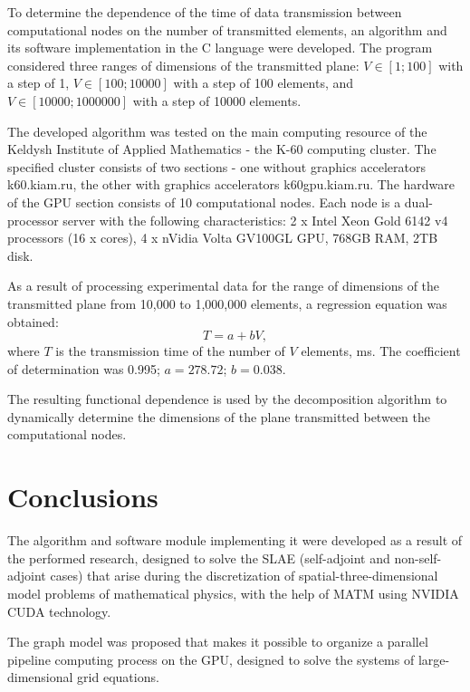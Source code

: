 \documentclass{svproc}
\begin{document}
To determine the dependence of the time of data transmission between computational nodes on the number of transmitted elements, an algorithm and its software implementation in the C language were developed.
The program considered three ranges of dimensions of the transmitted plane: $V\in[1; 100]$ with a step of 1,
$V\in[100; 10000]$ with a step of 100 elements, and
$V\in[10000; 1000000]$ with a step of 10000 elements. 

The developed algorithm was tested on the main computing resource of the Keldysh Institute of Applied Mathematics - the K-60 computing cluster.
The specified cluster consists of two sections - one without graphics accelerators k60.kiam.ru, the other with graphics accelerators k60gpu.kiam.ru.
The hardware of the GPU section consists of 10 computational nodes.
Each node is a dual-processor server with the following characteristics: 2 x Intel Xeon Gold 6142 v4 processors (16 x cores), 4 x nVidia Volta GV100GL GPU, 768GB RAM, 2TB disk.

As a result of processing experimental data for the range of dimensions of the transmitted plane from 10,000 to 1,000,000 elements, a regression equation was obtained:
\begin{equation}	
	T = a + b V,
\end{equation}
where
$T$ is the transmission time of the number of $V$ elements, ms.
The coefficient of determination was 0.995; $a = 278.72$; $b = 0.038$.

The resulting functional dependence is used by the decomposition algorithm to dynamically determine the dimensions of the plane transmitted between the computational nodes.



%
\section{Conclusions}
%
The algorithm and software module implementing it were developed as a result of the performed research, designed to solve the SLAE (self-adjoint and non-self-adjoint cases) that arise during the discretization of spatial-three-dimensional model problems of mathematical physics, with the help of MATM using NVIDIA CUDA technology.

The graph model was proposed that makes it possible to organize a parallel pipeline computing process on the GPU, designed to solve the systems of large-dimensional grid equations.
\end{document}

